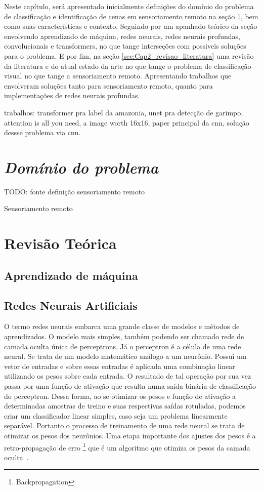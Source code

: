 Neste capítulo, será apresentado inicialmente definições do domínio do problema de classificação e identificação de cenas em sensoriamento remoto na seção \ref{sec:Cap2_dominio}, bem como suas características e contexto. Seguindo por um apanhado teórico da seção envolvendo aprendizado de máquina, redes neurais, redes neurais profundas, convolucionais e transformers, no que tange interseções com possiveis soluções para o problema. E por fim, na seção \ref{sec:Cap2_revisao_literatura} uma revisão da literatura e do atual estado da arte no que tange o problema de classificação visual no que tange a sensoriamento remoto. Apresentando trabalhos que envolveram soluções tanto para sensoriamento remoto, quanto para implementações de redes neurais profundas.

trabalhos: transformer pra label da amazonia, unet pra detecção de garimpo, attention is all you need, a image worth 16x16, paper principal da cnn, solução dessse problema via cnn.

\section{\textit{Domínio do problema}}\label{sec:Cap2_dominio}


TODO: fonte definição sensoriamento remoto

Sensoriamento remoto




\section{Revisão Teórica}\label{sec:Cap2_revisao_teorica}

\subsection{Aprendizado de máquina}\label{sec:aprendizado_maquina}

\subsection{Redes Neurais Artificiais}\label{sec:Cap2_redes_neurais}

O termo redes neurais embarca uma grande classe de modelos e métodos de aprendizados. O modelo mais simples, também podendo ser chamado rede de camada oculta única de perceptrons. Já o  perceptron é a célula de uma rede neural. Se trata de um modelo matemático análogo a um neurônio. Possui um vetor de entradas e sobre essas entradas é aplicada uma combinação linear utilizando os pesos sobre cada entrada. O resultado de tal operação por sua vez passa por uma função de ativação que resulta numa saída binária de classificação do perceptron. Dessa forma, ao se otimizar os pesos e função de ativação a determinadas amostras de treino e suas respectivas saídas rotuladas, podemos criar um classificador linear simples, caso seja um problema linearmente separável. Portanto o processo de treinamento de uma rede neural se trata de otimizar os pesos dos neurônios. Uma etapa importante dos ajustes dos pesos é a retro-propagação de erro \footnote{Backpropagation} que é um algoritmo que otimiza os pesos da camada oculta~\cite{hastie01statisticallearning}.

